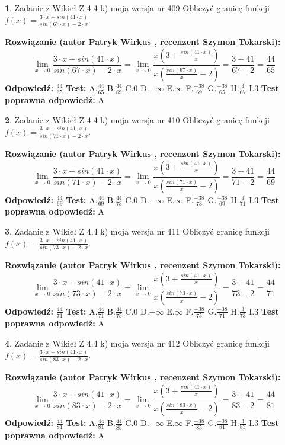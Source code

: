\documentclass[12pt, a4paper]{article}
\theoremstyle{definition} %
\newtheorem{zad}{}
\newcommand{\zadStart}[1]{\begin{zad}#1\newline}
\newcommand{\zadStop}{\end{zad}}
\newcommand{\rozwStart}[2]{\noindent \textbf{Rozwiązanie (autor #1 , recenzent #2): }\newline}
\newcommand{\rozwStop}{\newline}
\newcommand{\odpStart}{\noindent \textbf{Odpowiedź:}\newline}
\newcommand{\odpStop}{\newline}
\newcommand{\testStart}{\noindent \textbf{Test:}\newline}
\newcommand{\testStop}{\newline}
\newcommand{\kluczStart}{\noindent \textbf{Test poprawna odpowiedź:}\newline}
\newcommand{\kluczStop}{\newline}
\begin{document}
\zadStart{Zadanie z Wikieł Z 4.4 k) moja wersja nr 409}
Obliczyć granicę funkcji $f(x)=\frac{3\cdot x +sin(41\cdot x)}{sin(67\cdot x) -2\cdot x}$.
\zadStop
\rozwStart{Patryk Wirkus}{Szymon Tokarski}
$$\lim\limits_{x\to 0}\frac{3\cdot x +sin(41\cdot x)}{sin(67\cdot x) -2\cdot x}
=\lim\limits_{x\to 0}\frac{x(3+\frac{sin(41\cdot x)}{x})}{x(\frac{sin(67\cdot x)}{x}-2)}
=\frac{3+41}{67-2} = \frac{44}{65}$$
\rozwStop
\odpStart
$\frac{44}{65}$
\odpStop
\testStart
A.$\frac{44}{65}$
B.$\frac{44}{69}$
C.$0$
D.$-\infty$
E.$\infty$
F.$\frac{-38}{69}$
G.$\frac{-38}{65}$
H.$\frac{3}{67}$
I.$3$
\testStop
\kluczStart
A
\kluczStop



\zadStart{Zadanie z Wikieł Z 4.4 k) moja wersja nr 410}
Obliczyć granicę funkcji $f(x)=\frac{3\cdot x +sin(41\cdot x)}{sin(71\cdot x) -2\cdot x}$.
\zadStop
\rozwStart{Patryk Wirkus}{Szymon Tokarski}
$$\lim\limits_{x\to 0}\frac{3\cdot x +sin(41\cdot x)}{sin(71\cdot x) -2\cdot x}
=\lim\limits_{x\to 0}\frac{x(3+\frac{sin(41\cdot x)}{x})}{x(\frac{sin(71\cdot x)}{x}-2)}
=\frac{3+41}{71-2} = \frac{44}{69}$$
\rozwStop
\odpStart
$\frac{44}{69}$
\odpStop
\testStart
A.$\frac{44}{69}$
B.$\frac{44}{73}$
C.$0$
D.$-\infty$
E.$\infty$
F.$\frac{-38}{73}$
G.$\frac{-38}{69}$
H.$\frac{3}{71}$
I.$3$
\testStop
\kluczStart
A
\kluczStop



\zadStart{Zadanie z Wikieł Z 4.4 k) moja wersja nr 411}
Obliczyć granicę funkcji $f(x)=\frac{3\cdot x +sin(41\cdot x)}{sin(73\cdot x) -2\cdot x}$.
\zadStop
\rozwStart{Patryk Wirkus}{Szymon Tokarski}
$$\lim\limits_{x\to 0}\frac{3\cdot x +sin(41\cdot x)}{sin(73\cdot x) -2\cdot x}
=\lim\limits_{x\to 0}\frac{x(3+\frac{sin(41\cdot x)}{x})}{x(\frac{sin(73\cdot x)}{x}-2)}
=\frac{3+41}{73-2} = \frac{44}{71}$$
\rozwStop
\odpStart
$\frac{44}{71}$
\odpStop
\testStart
A.$\frac{44}{71}$
B.$\frac{44}{75}$
C.$0$
D.$-\infty$
E.$\infty$
F.$\frac{-38}{75}$
G.$\frac{-38}{71}$
H.$\frac{3}{73}$
I.$3$
\testStop
\kluczStart
A
\kluczStop



\zadStart{Zadanie z Wikieł Z 4.4 k) moja wersja nr 412}
Obliczyć granicę funkcji $f(x)=\frac{3\cdot x +sin(41\cdot x)}{sin(83\cdot x) -2\cdot x}$.
\zadStop
\rozwStart{Patryk Wirkus}{Szymon Tokarski}
$$\lim\limits_{x\to 0}\frac{3\cdot x +sin(41\cdot x)}{sin(83\cdot x) -2\cdot x}
=\lim\limits_{x\to 0}\frac{x(3+\frac{sin(41\cdot x)}{x})}{x(\frac{sin(83\cdot x)}{x}-2)}
=\frac{3+41}{83-2} = \frac{44}{81}$$
\rozwStop
\odpStart
$\frac{44}{81}$
\odpStop
\testStart
A.$\frac{44}{81}$
B.$\frac{44}{85}$
C.$0$
D.$-\infty$
E.$\infty$
F.$\frac{-38}{85}$
G.$\frac{-38}{81}$
H.$\frac{3}{83}$
I.$3$
\testStop
\kluczStart
A
\kluczStop
\end{document}
